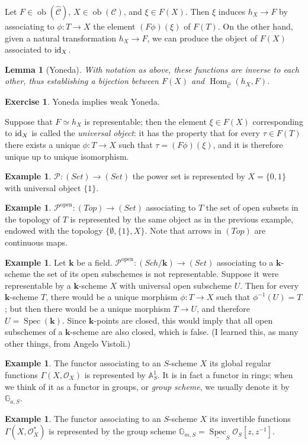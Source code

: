 \documentclass[11pt,twoside]{report}
\newcommand{\kk}{\mathbf k}
\newcommand{\OO}{\mathcal O}
\renewcommand{\to}{\rightarrow}
\newcommand{\Aaff}{\mathbb A}
\newcommand{\Spec}{\operatorname{Spec}}
\newcommand{\uSpec}{\underline{\operatorname{Spec}}}
\newcommand{\Hom}{\operatorname{Hom}}
\newcommand{\id}{{\rm id}}
\theoremstyle{plain}
\newtheorem{lem}[thm]{Lemma}
\theoremstyle{definition}
\newtheorem{exa}[thm]{Example}
\newtheorem{exe}[thm]{Exercise}
\begin{document}
Let $F\in\operatorname{ob}(\widehat{\mathcal C})$, $X\in\operatorname{ob}(\mathcal C)$, and $\xi\in F(X)$. Then $\xi$ induces $h_X\to F$ by associating to $\phi\colon T\to X$ the element $(F\phi)(\xi)$ of $F(T)$. On the other hand, given a natural transformation $h_X\to F$, we can produce the object of $F(X)$ associated to $\id_X$.
\begin{lem}[Yoneda]
 With notation as above, these functions are inverse to each other, thus establishing a bijection between $F(X)$ and $\Hom_{\widehat{\mathcal C}}(h_X,F)$.
\end{lem}
\begin{exe}
 Yoneda implies weak Yoneda.
\end{exe}
Suppose that $F\simeq h_X$ is representable; then the element $\xi\in F(X)$ corresponding to $\id_X$ is called the \emph{universal object}: it has the property that for every $\tau\in F(T)$ there exists a unique $\phi\colon T\to X$ such that $\tau=(F\phi)(\xi)$, and it is therefore unique up to unique isomorphism.
\begin{exa}
 $\mathcal P\colon(Set)\to(Set)$ the power set is represented by $X=\{0,1\}$ with universal object $\{1\}$.
\end{exa}
\begin{exa}
 $\mathcal P^\text{open}\colon(Top)\to(Set)$ associating to $T$ the set of open subsets in the topology of $T$ is represented by the same object as in the previous example, endowed with the topology $\{\emptyset,\{1\},X\}$. Note that arrows in $(Top)$ are continuous maps.
\end{exa}
\begin{exa}
 Let $\kk$ be a field. $\mathcal P^\text{open}\colon(Sch/\kk)\to(Set)$ associating to a $\kk$-scheme the set of its open subschemes is not representable. Suppose it were representable by a $\kk$-scheme $X$ with universal open subscheme $U$. Then for every $\kk$-scheme $T$, there would be a unique morphism $\phi\colon T\to X$ such that $\phi^{-1}(U)=T$; but then there would be a unique morphism $T\to U$, and therefore $U=\Spec(\kk)$. Since $\kk$-points are closed, this would imply that all open subschemes of a $\kk$-scheme are also closed, which is false. (I learned this, as many other things, from Angelo Vistoli.)
\end{exa}
\begin{exa}
 The functor associating to an $S$-scheme $X$ its global regular functions $\Gamma(X,\OO_X)$ is represented by $\Aaff^1_S$. It is in fact a functor in rings; when we think of it as a functor in groups, or \emph{group scheme}, we usually denote it by $\mathbb G_{a,S}$.
\end{exa}
\begin{exa}
 The functor associating to an $S$-scheme $X$ its invertible functions $\Gamma(X,\OO_X^*)$ is represented by the group scheme $\mathbb G_{m,S}=\uSpec_S\OO_S[z,z^{-1}]$.
\end{exa}
\end{document}
